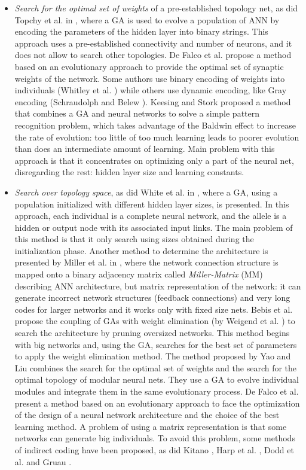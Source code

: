 \documentclass{elsart}
\begin{document}
\begin{itemize}
      \item \emph{Search for the optimal set of weights} of a pre-established topology net, as did Topchy et al. in \cite{Topchy}, where a GA is used to evolve a population of ANN by encoding the parameters of the hidden layer into binary strings. This approach uses a pre-established connectivity and number of neurons, and it does not allow to search other topologies.  De Falco et al. propose a method \cite{FalcoPPSN98} based on an evolutionary approach to provide the optimal set of synaptic weights of the network. 
Some authors use binary encoding of weights into individuals (Whitley et al. \cite{Whitley93}) while others use dynamic encoding, like Gray encoding (Schraudolph and Belew \cite{Schraudolph92}).
Keesing and Stork \cite{Keesing} proposed a method that combines a GA and neural networks to solve a simple pattern recognition problem, which takes advantage of the Baldwin effect \cite{Baldwin} to increase the rate of evolution: too little of too much learning leads to poorer evolution than does an intermediate amount of learning.
Main problem with this approach is that it concentrates on optimizing only a part of the neural net, disregarding the rest: hidden layer size and learning constants.

      \item \emph{Search over topology space}, as did White et al. in \cite{White}, where a GA, using a population initialized with different hidden layer sizes, is presented. In this approach, each individual is a complete neural network, and the allele is a hidden or output node with its associated input links. The main problem of this method is that it only search using sizes obtained during the initialization phase. Another method to determine the architecture is presented by Miller et al. in  \cite{Miller}, where the network connection structure is mapped onto a binary adjacency matrix called \emph{Miller-Matrix} (MM) describing ANN architecture, but matrix representation of the network: it can generate incorrect network structures (feedback connections) and very long codes for larger networks and it works only with fixed size nets. Bebis et al. \cite{Bebis} propose the coupling of GAs with weight elimination (by Weigend et al. \cite{Weigend}) to search the architecture by pruning oversized networks. This method begins with big networks and, using the GA, searches for the best set of parameters to apply the weight elimination method. 
The method proposed by Yao and Liu \cite{Yao98,Yao98b} combines the search for the optimal set of weights and the search for the optimal topology of modular neural nets. They use a GA to evolve individual modules and integrate them in the same evolutionary process.
De Falco et al. present a method \cite{Falco2} based on an evolutionary approach to face the optimization of the design of a neural network architecture and the choice of the best learning method.
A problem of using a matrix representation is that some networks can generate big individuals. To avoid this problem, some methods of indirect coding have been proposed, as did Kitano \cite{Kitano90}, Harp et al. \cite{Harp89}, Dodd et al. \cite{Dodd91} and Gruau \cite{Gruau92}.


\end{itemize}
\end{document}
